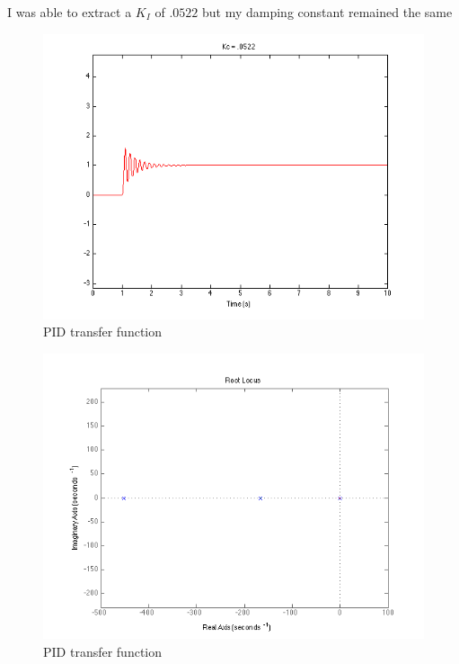 \documentclass[english]{article}
\begin{document}
I was able to extract a $K_I$ of $.0522$ but my damping constant remained the same 
\begin{figure}[h!]
\includegraphics[width = \linewidth]{failedplot.png}
\caption{PID transfer function}
\end{figure}
\FloatBarrier 
\begin{figure}[h!]
\includegraphics[width = \linewidth]{faildr.png}
\caption{PID transfer function}
\end{figure}
\FloatBarrier 
\end{document}
